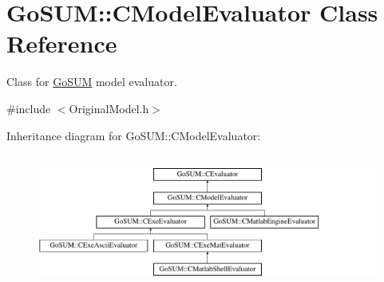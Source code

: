 \hypertarget{class_go_s_u_m_1_1_c_model_evaluator}{\section{Go\-S\-U\-M\-:\-:C\-Model\-Evaluator Class Reference}
\label{class_go_s_u_m_1_1_c_model_evaluator}
}


Class for \hyperlink{struct_go_s_u_m}{Go\-S\-U\-M} model evaluator.  




{\ttfamily \#include $<$Original\-Model.\-h$>$}

Inheritance diagram for Go\-S\-U\-M\-:\-:C\-Model\-Evaluator\-:\begin{figure}[H]
\begin{center}
\leavevmode
\includegraphics[height=4.465710cm]{class_go_s_u_m_1_1_c_model_evaluator}
\end{center}
\end{figure}
